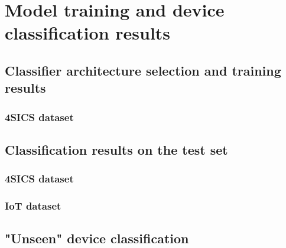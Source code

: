 \chapter{Model training and device classification results}

\section{Classifier architecture selection and training results}
\lipsum[1]
\subsection{4SICS dataset}

\section{Classification results on the test set}
\lipsum[1]
\subsection{4SICS dataset}
\lipsum[1]
\subsection{IoT dataset}
\lipsum[1]

\section{"Unseen" device classification}
\lipsum[1]
